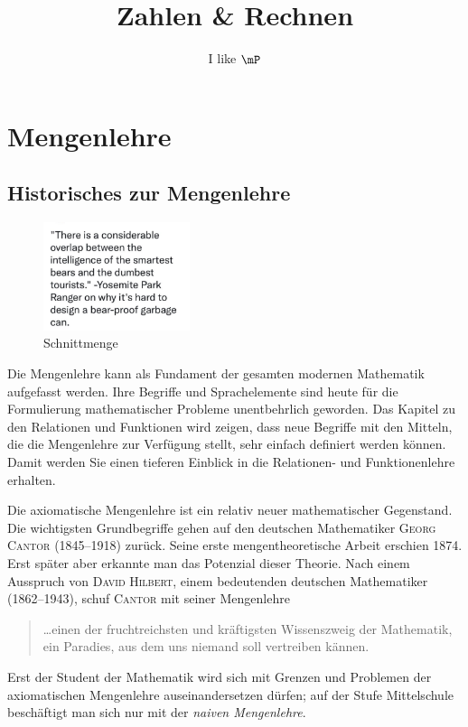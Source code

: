 \documentclass[%
11pt,%
twoside,%
titlepage,%
german,%
]{scrartcl}
\title{Zahlen \& Rechnen}
\subtitle{I like $\mP$}
\author{}
\date{}
\newcounter{theo}[section]\setcounter{theo}{0}
\begin{document}
\maketitle

\tableofcontents
\cleardoublepage

\section{Mengenlehre}

\subsection{Historisches zur Mengenlehre}
\begin{figure}
  \begin{center}
    \includegraphics[width=0.382\textwidth]{pictures/schnittmenge.jpeg}
  \end{center}
\caption{Schnittmenge}
\end{figure}
Die Mengenlehre kann als Fundament der gesamten modernen Mathematik aufgefasst werden. Ihre Begriffe und Sprachelemente sind heute f\"ur die Formulierung mathematischer Probleme unentbehrlich geworden. Das Kapitel zu den Relationen und Funktionen wird zeigen, dass neue Begriffe mit den Mitteln, die die Mengenlehre zur Verf\"ugung stellt, sehr einfach definiert werden k\"onnen. Damit werden Sie einen tieferen Einblick in die Relationen- und Funktionenlehre erhalten.

Die axiomatische Mengenlehre ist ein relativ neuer mathematischer Gegenstand. Die wichtigsten Grundbegriffe gehen auf den deutschen Mathematiker \textsc{Georg Cantor} (1845--1918) zur\"uck. Seine erste mengentheoretische Arbeit erschien 1874. Erst sp\"ater aber erkannte man das Potenzial dieser Theorie. Nach einem Ausspruch von \textsc{David Hilbert}, einem bedeutenden deutschen Mathematiker (1862--1943), schuf \textsc{Cantor} mit seiner Mengenlehre
\begin{quote}
\glqq\dots einen der fruchtreichsten und kr\"aftigsten Wissenszweig der Mathematik, ein Paradies, aus dem uns niemand soll vertreiben k\"annen.\grqq
\end{quote}
Erst der Student der Mathematik wird sich mit Grenzen und Problemen der axiomatischen Mengenlehre auseinandersetzen d\"urfen; auf der Stufe Mittelschule besch\"aftigt man sich nur mit der \emph{naiven Mengenlehre}.
\end{document}
